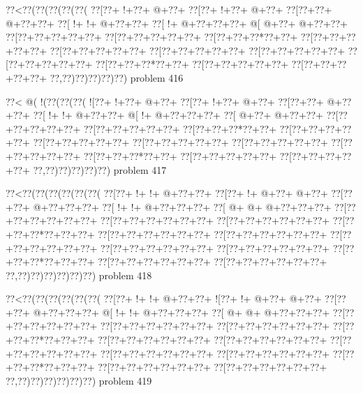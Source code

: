 \vbox{\vbox{\goo
\0??<\0??(\0??(\0??(\0??(\0??(
\0??[\0??+\- !+\0??+\- @+\0??+
\0??[\0??+\- !+\0??+\- @+\0??+
\0??[\0??+\0??+\- @+\0??+\0??+
\0??[\- !+\- !+\- @+\0??+\0??+
\0??[\- !+\- @+\0??+\0??+\0??+
\- @[\- @+\0??+\- @+\0??+\0??+
\0??[\0??+\0??+\0??+\0??+\0??+
\0??[\0??+\0??+\0??+\0??+\0??+
\0??[\0??+\0??+\0??*\0??+\0??+
\0??[\0??+\0??+\0??+\0??+\0??+
\0??[\0??+\0??+\0??+\0??+\0??+
\0??[\0??+\0??+\0??+\0??+\0??+
\0??[\0??+\0??+\0??+\0??+\0??+
\0??[\0??+\0??+\0??+\0??+\0??+
\0??[\0??+\0??+\0??*\0??+\0??+
\0??[\0??+\0??+\0??+\0??+\0??+
\0??[\0??+\0??+\0??+\0??+\0??+
\0??,\0??)\0??)\0??)\0??)\0??)
}
\hfil problem 416\hfil\break
}

\vbox{\vbox{\goo
\0??<\- @(\- !(\0??(\0??(\0??(
\- ![\0??+\- !+\0??+\- @+\0??+
\0??[\0??+\- !+\0??+\- @+\0??+
\0??[\0??+\0??+\- @+\0??+\0??+
\0??[\- !+\- !+\- @+\0??+\0??+
\- @[\- !+\- @+\0??+\0??+\0??+
\0??[\- @+\0??+\- @+\0??+\0??+
\0??[\0??+\0??+\0??+\0??+\0??+
\0??[\0??+\0??+\0??+\0??+\0??+
\0??[\0??+\0??+\0??*\0??+\0??+
\0??[\0??+\0??+\0??+\0??+\0??+
\0??[\0??+\0??+\0??+\0??+\0??+
\0??[\0??+\0??+\0??+\0??+\0??+
\0??[\0??+\0??+\0??+\0??+\0??+
\0??[\0??+\0??+\0??+\0??+\0??+
\0??[\0??+\0??+\0??*\0??+\0??+
\0??[\0??+\0??+\0??+\0??+\0??+
\0??[\0??+\0??+\0??+\0??+\0??+
\0??,\0??)\0??)\0??)\0??)\0??)
}
\hfil problem 417\hfil\break
}

\vbox{\vbox{\goo
\0??<\0??(\0??(\0??(\0??(\0??(\0??(
\0??[\0??+\- !+\- !+\- @+\0??+\0??+
\0??[\0??+\- !+\- @+\0??+\- @+\0??+
\0??[\0??+\0??+\- @+\0??+\0??+\0??+
\0??[\- !+\- !+\- @+\0??+\0??+\0??+
\0??[\- @+\- @+\- @+\0??+\0??+\0??+
\0??[\0??+\0??+\0??+\0??+\0??+\0??+
\0??[\0??+\0??+\0??+\0??+\0??+\0??+
\0??[\0??+\0??+\0??+\0??+\0??+\0??+
\0??[\0??+\0??+\0??*\0??+\0??+\0??+
\0??[\0??+\0??+\0??+\0??+\0??+\0??+
\0??[\0??+\0??+\0??+\0??+\0??+\0??+
\0??[\0??+\0??+\0??+\0??+\0??+\0??+
\0??[\0??+\0??+\0??+\0??+\0??+\0??+
\0??[\0??+\0??+\0??+\0??+\0??+\0??+
\0??[\0??+\0??+\0??*\0??+\0??+\0??+
\0??[\0??+\0??+\0??+\0??+\0??+\0??+
\0??[\0??+\0??+\0??+\0??+\0??+\0??+
\0??,\0??)\0??)\0??)\0??)\0??)\0??)
}
\hfil problem 418\hfil\break
}

\vbox{\vbox{\goo
\0??<\0??(\0??(\0??(\0??(\0??(\0??(
\0??[\0??+\- !+\- !+\- @+\0??+\0??+
\- ![\0??+\- !+\- @+\0??+\- @+\0??+
\0??[\0??+\0??+\- @+\0??+\0??+\0??+
\- @[\- !+\- !+\- @+\0??+\0??+\0??+
\0??[\- @+\- @+\- @+\0??+\0??+\0??+
\0??[\0??+\0??+\0??+\0??+\0??+\0??+
\0??[\0??+\0??+\0??+\0??+\0??+\0??+
\0??[\0??+\0??+\0??+\0??+\0??+\0??+
\0??[\0??+\0??+\0??*\0??+\0??+\0??+
\0??[\0??+\0??+\0??+\0??+\0??+\0??+
\0??[\0??+\0??+\0??+\0??+\0??+\0??+
\0??[\0??+\0??+\0??+\0??+\0??+\0??+
\0??[\0??+\0??+\0??+\0??+\0??+\0??+
\0??[\0??+\0??+\0??+\0??+\0??+\0??+
\0??[\0??+\0??+\0??*\0??+\0??+\0??+
\0??[\0??+\0??+\0??+\0??+\0??+\0??+
\0??[\0??+\0??+\0??+\0??+\0??+\0??+
\0??,\0??)\0??)\0??)\0??)\0??)\0??)
}
\hfil problem 419\hfil\break
}

